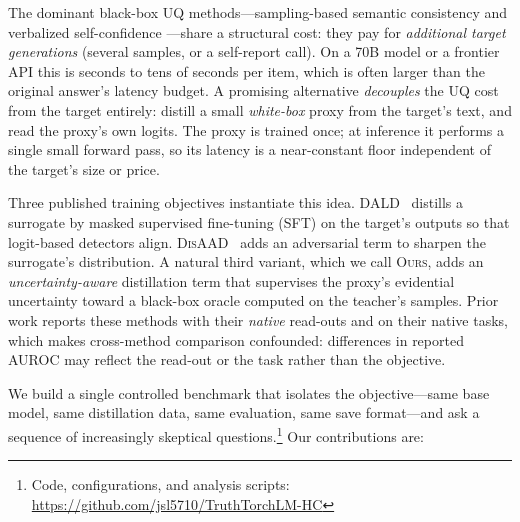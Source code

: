 \documentclass[11pt]{article}
\newcommand{\ours}{\textsc{Ours}}
\newcommand{\dald}{\textsc{DALD}}
\newcommand{\disaad}{\textsc{DisAAD}}
\begin{document}
The dominant black-box UQ methods---sampling-based semantic consistency
\citep{kuhn2023semantic,farquhar2024detecting,lin2023generating} and verbalized
self-confidence \citep{lin2022teaching}---share a structural cost: they pay for
\emph{additional target generations} (several samples, or a self-report call). On a
70B model or a frontier API this is seconds to tens of seconds per item, which is
often larger than the original answer's latency budget. A promising alternative
\emph{decouples} the UQ cost from the target entirely: distill a small \emph{white-box}
proxy from the target's text, and read the proxy's own logits. The proxy is trained
once; at inference it performs a single small forward pass, so its latency is a
near-constant floor independent of the target's size or price.

Three published training objectives instantiate this idea.
\dald~\citep{zeng2024dald} distills a surrogate by masked supervised fine-tuning
(SFT) on the target's outputs so that logit-based detectors align.
\disaad~\citep{cui2026disaad} adds an adversarial term to sharpen the surrogate's
distribution. A natural third variant, which we call \ours, adds an
\emph{uncertainty-aware} distillation term that supervises the proxy's evidential
uncertainty toward a black-box oracle computed on the teacher's samples. Prior work
reports these methods with their \emph{native} read-outs and on their native tasks,
which makes cross-method comparison confounded: differences in reported AUROC may
reflect the read-out or the task rather than the objective.

We build a single controlled benchmark that isolates the objective---same base model,
same distillation data, same evaluation, same save format---and ask a sequence of
increasingly skeptical questions.\footnote{Code, configurations, and analysis scripts:
\url{https://github.com/jsl5710/TruthTorchLM-HC}} Our contributions are:
\end{document}
